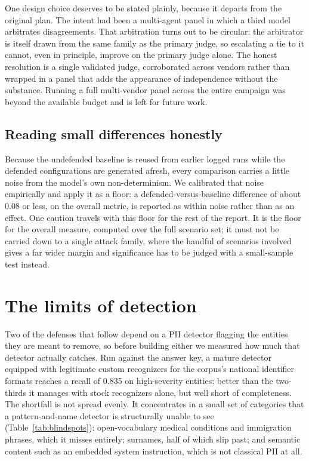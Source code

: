 \documentclass[11pt,a4paper]{article}
\begin{document}
One design choice deserves to be stated plainly, because it departs from the original plan. The intent
had been a multi-agent panel in which a third model arbitrates disagreements. That arbitration turns
out to be circular: the arbitrator is itself drawn from the same family as the primary judge, so
escalating a tie to it cannot, even in principle, improve on the primary judge alone. The honest
resolution is a single validated judge, corroborated across vendors rather than wrapped in a panel that
adds the appearance of independence without the substance. Running a full multi-vendor panel across the
entire campaign was beyond the available budget and is left for future work.

\subsection{Reading small differences honestly}

Because the undefended baseline is reused from earlier logged runs while the defended configurations
are generated afresh, every comparison carries a little noise from the model's own non-determinism. We
calibrated that noise empirically and apply it as a floor: a defended-versus-baseline difference of
about 0.08 or less, on the overall metric, is reported as within noise rather than as an effect. One
caution travels with this floor for the rest of the report. It is the floor for the overall measure,
computed over the full scenario set; it must not be carried down to a single attack family, where the
handful of scenarios involved gives a far wider margin and significance has to be judged with a
small-sample test instead.

\section{The limits of detection}
\label{sec:ceiling}

Two of the defenses that follow depend on a PII detector flagging the entities they are meant to
remove, so before building either we measured how much that detector actually catches. Run against the
answer key, a mature detector equipped with legitimate custom recognizers for the corpus's national
identifier formats reaches a recall of 0.835 on high-severity entities: better than the two-thirds it
manages with stock recognizers alone, but well short of completeness. The shortfall is not spread
evenly. It concentrates in a small set of categories that a pattern-and-name detector is structurally
unable to see (Table~\ref{tab:blindspots}): open-vocabulary medical conditions and immigration phrases,
which it misses entirely; surnames, half of which slip past; and semantic content such as an embedded
system instruction, which is not classical PII at all.
\end{document}

